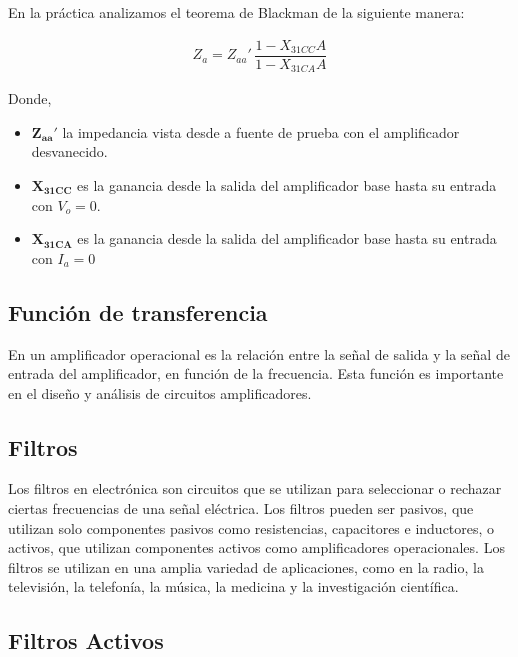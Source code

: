         En la práctica analizamos el teorema de Blackman de la siguiente manera:

        \begin{gather}
            Z_a=Z_{aa}' \, \dfrac{1-X_{31CC}A}{1-X_{31CA}A}
        \end{gather}

        Donde,

        \begin{itemize}
            \item $\mathbf{Z_{aa}'}$ la impedancia vista desde a fuente de prueba con el amplificador desvanecido.

            \item $\mathbf{X_{31CC}}$ es la ganancia desde la salida del amplificador base hasta su entrada con $V_o=0$.

            \item $\mathbf{X_{31CA}}$ es la ganancia desde la salida del amplificador base hasta su entrada con $I_a=0$
        \end{itemize}

    \subsection{Función de transferencia}

        En un amplificador operacional es la relación entre la señal de salida y la señal de entrada del amplificador, en función de la frecuencia. Esta función es importante en el diseño y análisis de circuitos amplificadores.

    \subsection{Filtros}

        Los filtros en electrónica son circuitos que se utilizan para seleccionar o rechazar ciertas frecuencias de una señal eléctrica. Los filtros pueden ser pasivos, que utilizan solo componentes pasivos como resistencias, capacitores e inductores, o activos, que utilizan componentes activos como amplificadores operacionales. Los filtros se utilizan en una amplia variedad de aplicaciones, como en la radio, la televisión, la telefonía, la música, la medicina y la investigación científica.

    \subsection{Filtros Activos}

